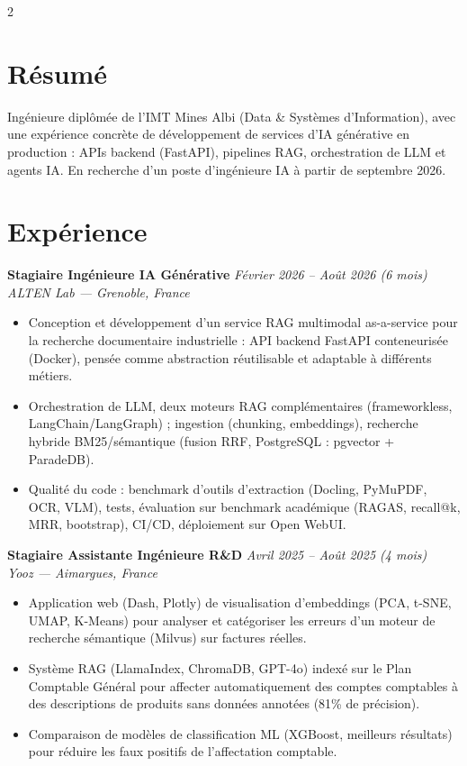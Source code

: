 \documentclass[10.5pt,a4paper]{article}
\newcommand{\sectionrule}{\vspace{-6pt}{\color{accent}\hrule height 1pt}\vspace{2pt}}
\newcommand{\cvexp}[5]{%
  \noindent\textbf{#1} \hfill {\itshape\color{graytext}\small #4}\\
  {\itshape #2 --- #3}\\[-2pt]
  #5
  \vspace{5pt}
}
\begin{document}
\setlength{\columnsep}{1.5em}
\begin{paracol}{2}

\section*{Résumé}
\sectionrule
\justifying
Ingénieure diplômée de l'IMT Mines Albi (Data \& Systèmes d'Information), avec une expérience concrète de développement de services d'IA générative en production : APIs backend (FastAPI), pipelines RAG, orchestration de LLM et agents IA. En recherche d'un poste d'ingénieure IA à partir de septembre 2026.

\section*{Expérience}
\sectionrule

\cvexp{Stagiaire Ingénieure IA Générative}{ALTEN Lab}{Grenoble, France}{Février 2026 -- Août 2026 (6 mois)}{%
  \begin{itemize}[leftmargin=12pt, itemsep=2pt, topsep=0pt, partopsep=0pt, parsep=0pt]
    \item Conception et développement d'un service RAG multimodal as-a-service pour la recherche documentaire industrielle : API backend FastAPI conteneurisée (Docker), pensée comme abstraction réutilisable et adaptable à différents métiers.
    \item Orchestration de LLM, deux moteurs RAG complémentaires (frameworkless, LangChain/\allowbreak LangGraph) ; ingestion (chunking, embeddings), recherche hybride BM25/sémantique (fusion RRF, PostgreSQL : pgvector + ParadeDB).
    \item Qualité du code : benchmark d'outils d'extraction (Docling, PyMuPDF, OCR, VLM), tests, évaluation sur benchmark académique (RAGAS, recall@k, MRR, bootstrap), CI/CD, déploiement sur Open WebUI.
  \end{itemize}
}

\cvexp{Stagiaire Assistante Ingénieure R\&D}{Yooz}{Aimargues, France}{Avril 2025 -- Août 2025 (4 mois)}{%
  \begin{itemize}[leftmargin=12pt, itemsep=2pt, topsep=0pt, partopsep=0pt, parsep=0pt]
    \item Application web (Dash, Plotly) de visualisation d'embeddings (PCA, t-SNE, UMAP, K-Means) pour analyser et catégoriser les erreurs d'un moteur de recherche sémantique (Milvus) sur factures réelles.
    \item Système RAG (LlamaIndex, ChromaDB, GPT-4o) indexé sur le Plan Comptable Général pour affecter automatiquement des comptes comptables à des descriptions de produits sans données annotées (81\% de précision).
    \item Comparaison de modèles de classification ML (XGBoost, meilleurs résultats) pour réduire les faux positifs de l'affectation comptable.
  \end{itemize}
}


\end{paracol}
\end{document}
